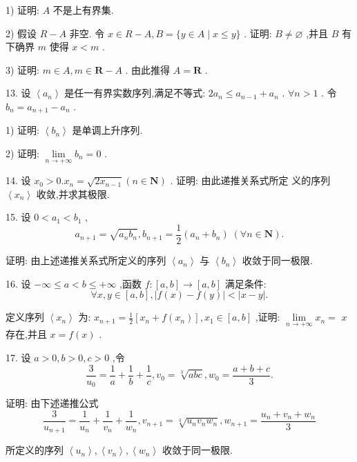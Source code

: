 1) 证明: $A$ 不是上有界集.

2) 假设 $R - A$ 非空. 令 $x \in  R - A,B = \{ y \in  A \mid  x \leq  y\}$ . 证明: $B \neq  \varnothing$ ,并且 $B$ 有下确界 $m$ 使得 $x < m$ .

3) 证明: $m \in  A,m \in  \mathbf{R} - A$ . 由此推得 $A = \mathbf{R}$ .

13. 设 $\left\langle  {a}_{n}\right\rangle$ 是任一有界实数序列,满足不等式: $2{a}_{n} \leq  {a}_{n - 1} + {a}_{n}$ . $\forall n > 1$ . 令 ${b}_{n} = {a}_{n + 1} - {a}_{n}$ .

1) 证明: $\left\langle  {b}_{n}\right\rangle$ 是单调上升序列.

2) 证明: $\mathop{\lim }\limits_{{n \rightarrow   + \infty }}{b}_{n} = 0$ .

14. 设 ${x}_{0} > 0.{x}_{n} = \sqrt{2{x}_{n - 1}}\left( {n \in  \mathbf{N}}\right)$ . 证明: 由此递推关系式所定 义的序列 $\left\langle  {x}_{n}\right\rangle$ 收敛,并求其极限.

15. 设 $0 < {a}_{1} < {b}_{1}$ ,
$${a}_{n + 1} = \sqrt{{a}_{n}{b}_{n}},{b}_{n + 1} = \frac{1}{2}\left( {{a}_{n} + {b}_{n}}\right) \;\left( {\forall n \in  \mathbf{N}}\right) .$$

证明: 由上述递推关系式所定义的序列 $\left\langle  {a}_{n}\right\rangle$ 与 $\left\langle  {b}_{n}\right\rangle$ 收敛于同一极限.

16. 设 $- \infty  \leq  a < b \leq   + \infty$ ,函数 $f : \left\lbrack  {a,b}\right\rbrack   \rightarrow  \left\lbrack  {a,b}\right\rbrack$ 满足条件:
$$\forall x,y \in  \left\lbrack  {a,b}\right\rbrack  ,\left| {f\left( x\right)  - f\left( y\right) }\right|  < \left| {x - y}\right| .$$

定义序列 $\left\langle  {x}_{n}\right\rangle$ 为: ${x}_{n + 1} = \frac{1}{2}\left\lbrack  {{x}_{n} + f\left( {x}_{n}\right) }\right\rbrack  ,{x}_{1} \in  \left\lbrack  {a,b}\right\rbrack$ ,证明: $\mathop{\lim }\limits_{{n \rightarrow   + \infty }}{x}_{n} =$  $x$ 存在,并且 $x = f\left( x\right)$ .

17. 设 $a > 0,b > 0,c > 0$ ,令
$$\frac{3}{{u}_{0}} = \frac{1}{a} + \frac{1}{b} + \frac{1}{c},{v}_{0} = \sqrt[3]{abc},{w}_{0} = \frac{a + b + c}{3}.$$

证明: 由下述递推公式
$$\frac{3}{{u}_{n + 1}} = \frac{1}{{u}_{n}} + \frac{1}{{v}_{n}} + \frac{1}{{w}_{n}},{v}_{n + 1} = \sqrt[3]{{u}_{n}{v}_{n}{w}_{n}},{w}_{n + 1} = \frac{{u}_{n} + {v}_{n} + {w}_{n}}{3}$$

所定义的序列 $\left\langle  {u}_{n}\right\rangle  ,\left\langle  {v}_{n}\right\rangle  ,\left\langle  {w}_{n}\right\rangle$ 收敛于同一极限.

